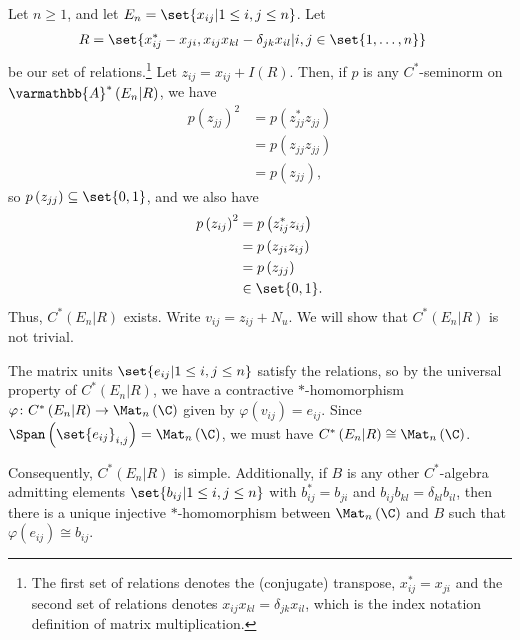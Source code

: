 \documentclass[10pt]{mypackage}
\renewcommand*{\mathbb}[1]{\varmathbb{#1}}
\newcommand{\A}{\mathbb{A}}
\begin{document}
\begin{example}
  Let $n\geq 1$, and let $E_n = \set{x_{ij} | 1 \leq i,j \leq n}$. Let
  \begin{align*}
    R &= \set{x_{ij}^{\ast} - x_{ji},x_{ij}x_{kl} - \delta_{jk}x_{il} | i,j\in \set{1,\dots,n}}
  \end{align*}
  be our set of relations.\footnote{The first set of relations denotes the (conjugate) transpose, $x_{ij}^{\ast} = x_{ji}$ and the second set of relations denotes $x_{ij}x_{kl} = \delta_{jk}x_{il}$, which is the index notation definition of matrix multiplication.} Let $z_{ij} = x_{ij} + I(R)$. Then, if $p$ is any $C^{\ast}$-seminorm on $\A^{\ast}\left(E_n|R\right)$, we have
  \begin{align*}
    p\left(z_{jj}\right)^2 &= p\left(z_{jj}^{\ast}z_{jj}\right)\\
                           &= p\left(z_{jj}z_{jj}\right)\\
                           &= p\left(z_{jj}\right),
  \end{align*}
  so $p\left(z_{jj}\right) \subseteq \set{0,1}$, and we also have
  \begin{align*}
    p\left(z_{ij}\right)^2 &= p\left(z_{ij}^{\ast}z_{ij}\right)\\
                           &= p\left(z_{ji}z_{ij}\right)\\
                           &= p\left(z_{jj}\right)\\
                           &\in \set{0,1}.
  \end{align*}
  Thus, $C^{\ast}\left(E_n|R\right)$ exists. Write $v_{ij} = z_{ij} + N_u$. We will show that $C^{\ast}\left(E_n|R\right)$ is not trivial.\newline

  The matrix units $\set{e_{ij} | 1\leq i,j \leq n}$ satisfy the relations, so by the universal property of $C^{\ast}\left(E_n|R\right)$, we have a contractive $\ast$-homomorphism $\varphi\colon C^{\ast}\left(E_n|R\right) \rightarrow \Mat_n\left(\C\right)$ given by $\varphi\left(v_{ij}\right) = e_{ij}$. Since $\Span\left(\set{e_{ij}}_{i,j}\right) = \Mat_n\left(\C\right)$, we must have $C^{\ast}\left(E_n|R\right) \cong \Mat_n\left(\C\right)$.\newline

  Consequently, $C^{\ast}\left(E_n|R\right)$ is simple. Additionally, if $B$ is any other $C^{\ast}$-algebra admitting elements $\set{b_{ij} | 1\leq i,j \leq n}$ with $b_{ij}^{\ast} = b_{ji}$ and $b_{ij}b_{kl} = \delta_{kl}b_{il}$, then there is a unique injective $\ast$-homomorphism between $\Mat_n\left(\C\right)$ and $B$ such that $\varphi\left(e_{ij}\right)\cong b_{ij}$.\newline


\end{example}
\end{document}
